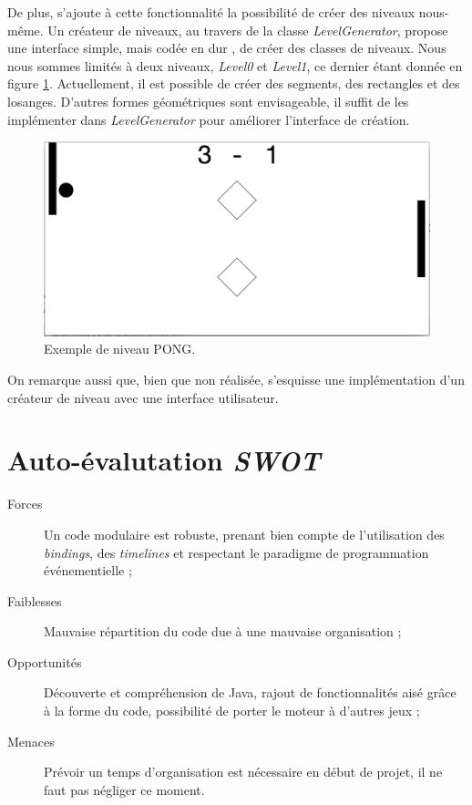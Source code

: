 \documentclass[a4paper,10pt]{article}
\theoremstyle{definition}
\begin{document}
	De plus, s'ajoute à cette fonctionnalité la possibilité de créer des niveaux nous-même. Un créateur de niveaux, au travers de la classe \emph{LevelGenerator}, propose une interface simple, mais \og codée en dur \fg{}, de créer des classes de niveaux. Nous nous sommes limités à deux niveaux, \emph{Level0} et \emph{Level1}, ce dernier étant donnée en figure \ref{fig:level1}. Actuellement, il est possible de créer des segments, des rectangles et des losanges. D'autres formes géométriques sont envisageable, il suffit de les implémenter dans \emph{LevelGenerator} pour améliorer l'interface de création. 
		
	\begin{figure}[!h]
  	  \begin{center}
    	    \includegraphics[width=\textwidth]{level1.png}
    	    \caption{Exemple de niveau PONG.}
    	    \label{fig:level1}
  	  \end{center}
	\end{figure}
	
	On remarque aussi que, bien que non réalisée, s'esquisse une implémentation d'un créateur de niveau avec une interface utilisateur.

\section*{Auto-évalutation \emph{SWOT}}

\begin{description}
	\item[Forces] Un code modulaire est robuste, prenant bien compte de l'utilisation des \emph{bindings}, des \emph{timelines} et respectant le paradigme de programmation événementielle ; 
	\item[Faiblesses] Mauvaise répartition du code due à une mauvaise organisation ;
	\item[Opportunités] Découverte et compréhension de Java, rajout de fonctionnalités aisé grâce à la forme du code, possibilité de porter le moteur à d'autres jeux ;
	\item[Menaces] Prévoir un temps d'organisation est nécessaire en début de projet, il ne faut pas négliger ce moment.
\end{description}
\end{document}
